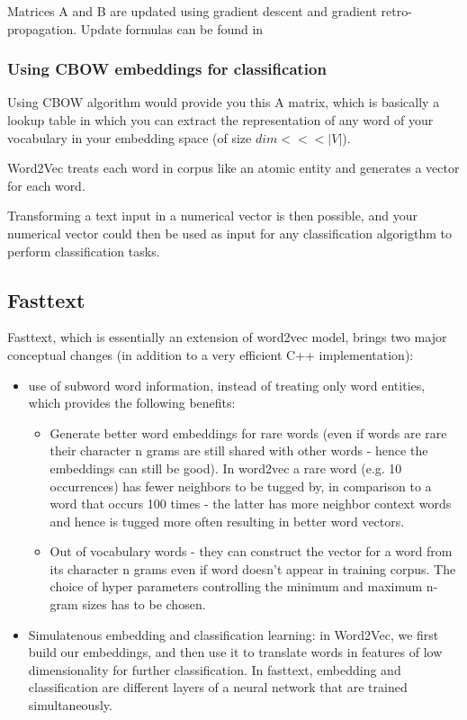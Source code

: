 Matrices A and B are updated using gradient descent and gradient retro-propagation. Update formulas can be found in \cite{yolo}

\subsubsection{Using CBOW embeddings for classification}

Using CBOW algorithm would provide you this A matrix, which is basically a lookup table in which you can extract the representation of any word of your vocabulary in your embedding space (of size $dim <<< |V|$).

Word2Vec treats each word in corpus like an atomic entity and generates a vector for each word.

Transforming a text input in a numerical vector is then possible, and your numerical vector could then be used as input for any classification algorigthm to perform classification tasks.

\subsection{Fasttext}

Fasttext, which is essentially an extension of word2vec model, brings two major conceptual changes (in addition to a very efficient C++ implementation):
\begin{itemize}
	\item use of subword word information, instead of treating only word entities, which provides the following benefits:
	\begin{itemize}
		\item Generate better word embeddings for rare words (even if words are rare their character n grams are still shared with other words - hence the embeddings can still be good). In word2vec a rare word (e.g. 10 occurrences) has fewer neighbors to be tugged by, in comparison to a word that occurs 100 times - the latter has more neighbor context words and hence is tugged more often resulting in better word vectors.
		\item Out of vocabulary words - they can construct the vector for a word from its character n grams even if word doesn't appear in training corpus. The choice of hyper parameters controlling the minimum and maximum n-gram sizes has to be chosen.
	\end{itemize}
	\item Simulatenous embedding and classification learning: in Word2Vec, we first build our embeddings, and then use it to translate words in features of low dimensionality for further classification. In fasttext, embedding and classification are different layers of a neural network that are trained simultaneously.
\end{itemize}

